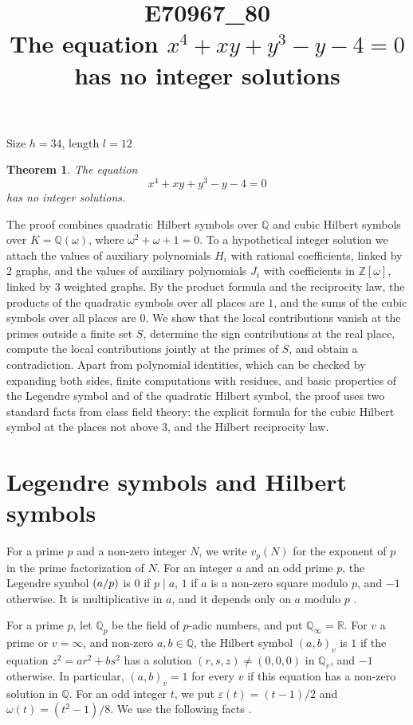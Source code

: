 \documentclass[11pt]{article}
\title{\textbf{E70967\_80}\\[4pt] {\Large The equation $x^{4}+xy+y^{3}-y-4=0$ has no integer solutions}}
\author{}
\date{}
\newtheorem{theorem}{Theorem}
\newcommand{\Z}{\mathbb{Z}}
\newcommand{\Q}{\mathbb{Q}}
\newcommand{\leg}[2]{\mathchoice{\biggl(\dfrac{#1}{#2}\biggr)}{(#1/#2)}{(#1/#2)}{(#1/#2)}}
\begin{document}
\maketitle
\vspace{-8ex}
\begin{center}
Size $h=34$, length $l=12$
\end{center}

\begin{theorem}\label{thm:main}
The equation
\begin{equation}\label{eq:main}
x^{4}+xy+y^{3}-y-4=0
\end{equation}
has no integer solutions.
\end{theorem}

The proof combines quadratic Hilbert symbols over $\Q$ and cubic Hilbert symbols over $K=\Q(\omega)$, where $\omega^2+\omega+1=0$. To a hypothetical integer solution we attach the values of auxiliary polynomials $H_i$ with rational coefficients, linked by 2 graphs, and the values of auxiliary polynomials $J_i$ with coefficients in $\Z[\omega]$, linked by 3 weighted graphs. By the product formula and the reciprocity law, the products of the quadratic symbols over all places are $1$, and the sums of the cubic symbols over all places are $0$. We show that the local contributions vanish at the primes outside a finite set $S$, determine the sign contributions at the real place, compute the local contributions jointly at the primes of $S$, and obtain a contradiction. Apart from polynomial identities, which can be checked by expanding both sides, finite computations with residues, and basic properties of the Legendre symbol and of the quadratic Hilbert symbol, the proof uses two standard facts from class field theory: the explicit formula for the cubic Hilbert symbol at the places not above $3$, and the Hilbert reciprocity law.

\section{Legendre symbols and Hilbert symbols}

For a prime $p$ and a non-zero integer $N$, we write $v_p(N)$ for the exponent of $p$ in the prime factorization of $N$. For an integer $a$ and an odd prime $p$, the Legendre symbol $\leg{a}{p}$ is $0$ if $p\mid a$, $1$ if $a$ is a non-zero square modulo $p$, and $-1$ otherwise. It is multiplicative in $a$, and it depends only on $a$ modulo $p$ \cite[Chapter~5]{IR}.

For a prime $p$, let $\Q_p$ be the field of $p$-adic numbers, and put $\Q_\infty=\mathbb R$. For $v$ a prime or $v=\infty$, and non-zero $a,b\in\Q$, the Hilbert symbol $(a,b)_v$ is $1$ if the equation $z^2=ar^2+bs^2$ has a solution $(r,s,z)\neq(0,0,0)$ in $\Q_v$, and $-1$ otherwise. In particular, $(a,b)_v=1$ for every $v$ if this equation has a non-zero solution in $\Q$. For an odd integer $t$, we put $\varepsilon(t)=(t-1)/2$ and $\omega(t)=(t^2-1)/8$. We use the following facts \cite[Chapter~III, Proposition~2 and Theorems~1 and~3]{Se}.
\end{document}
